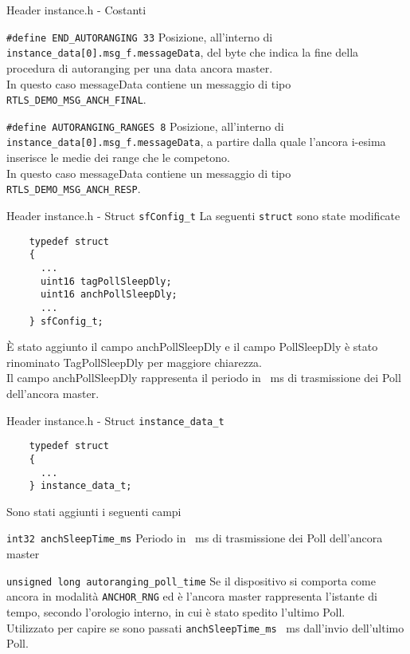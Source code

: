 \begin{frame}[fragile]{Header instance.h - Costanti}
  \begin{block}{\lstinline!#define END_AUTORANGING 33!}
    Posizione, all'interno di \lstinline!instance_data[0].msg_f.messageData!, del byte
    che indica la fine della procedura di autoranging per una data ancora master.\\
    In questo caso messageData contiene un messaggio di tipo \lstinline!RTLS_DEMO_MSG_ANCH_FINAL!.
  \end{block}
  \begin{block}{\lstinline!#define AUTORANGING_RANGES 8!}
    Posizione, all'interno di \lstinline!instance_data[0].msg_f.messageData!, a partire dalla quale
    l'ancora i-esima inserisce le medie dei range che le competono.\\
    In questo caso messageData contiene un messaggio di tipo \lstinline!RTLS_DEMO_MSG_ANCH_RESP!.
  \end{block}
\end{frame}

\begin{frame}[fragile]{Header instance.h - Struct \lstinline!sfConfig_t!}
  La seguenti \lstinline!struct! sono state modificate
  \begin{lstlisting}
    typedef struct
    {
      ...
      uint16 tagPollSleepDly;
      uint16 anchPollSleepDly;
      ...
    } sfConfig_t;
  \end{lstlisting}
  È stato aggiunto il campo anchPollSleepDly e il campo PollSleepDly è stato rinominato
  TagPollSleepDly per maggiore chiarezza.\\
  Il campo anchPollSleepDly rappresenta il periodo in \SI{}{\milli\second} di trasmissione dei Poll
  dell'ancora master.

\end{frame}

\begin{frame}[fragile]{Header instance.h - Struct \lstinline!instance_data_t!}
  \begin{lstlisting}
    typedef struct
    {
      ...
    } instance_data_t;
  \end{lstlisting}
  Sono stati aggiunti i seguenti campi
  \begin{block}{\lstinline!int32 anchSleepTime_ms!}
    Periodo in \SI{}{\milli\second} di trasmissione dei Poll dell'ancora master
  \end{block}
  
  \begin{block}{\lstinline!unsigned long autoranging_poll_time!}
    Se il dispositivo si comporta come ancora in modalità \lstinline!ANCHOR_RNG! ed è l'ancora master
    rappresenta l'istante di tempo, secondo l'orologio interno, in cui è stato spedito l'ultimo Poll.\\
    Utilizzato per capire se sono passati \lstinline!anchSleepTime_ms! \SI{}{\milli\second} dall'invio dell'ultimo Poll.\\
  \end{block}
\end{frame}

